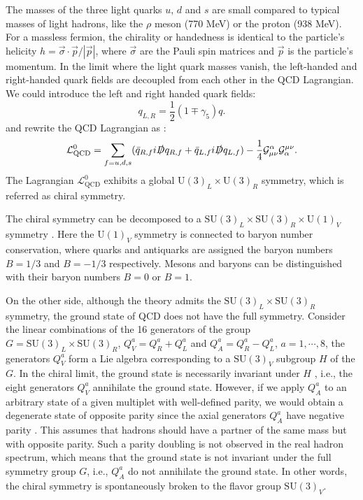The masses of the three light quarks $u$, $d$ and $s$ are small compared to typical masses of light hadrons, like the $\rho$ meson (770 MeV) or the proton (938 MeV). For a massless fermion, the chirality or handedness is identical to the particle's helicity $h = \vec{\sigma}\cdot\vec{p}/|\vec{p}|$, where $\vec{\sigma}$ are the Pauli spin matrices and $\vec{p}$ is the particle's momentum. In the limit where the light quark masses vanish, the left-handed and right-handed quark fields are decoupled from each other in the QCD Lagrangian. We could introduce the left and right handed quark fields:
\begin{equation}\label{C3S1E2}
q_{L,R} = \frac{1}{2}(1\mp\gamma_5)q.
\end{equation}
and rewrite the QCD Lagrangian as \cite{Scherer2003}:
\begin{equation} \label{C3S1E3}
\mathcal{L}_{\mathrm{QCD}}^0 = \sum_{f=u,d,s}(\bar{q}_{R,f}i\slashed{D}q_{R,f}+\bar{q}_{L,f}i\slashed{D}q_{L,f})-\frac{1}{4}\mathcal{G}_{\mu\nu}^\alpha\mathcal{G}_\alpha^{\mu\nu}.
\end{equation}
The Lagrangian $\mathcal{L}_{\mathrm{QCD}}^0$ exhibits a global $\mathrm{U}(3)_L\times\mathrm{U}(3)_R$ symmetry, which is referred as chiral symmetry.

The chiral symmetry can be decomposed to a $\mathrm{SU}(3)_L\times\mathrm{SU}(3)_R\times\mathrm{U}(1)_V$ symmetry \cite{Scherer2003}. Here the $\mathrm{U}(1)_V$ symmetry is connected to baryon number conservation, where quarks and antiquarks are assigned the baryon numbers $B=1/3$ and $B=-1/3$ respectively. Mesons and baryons can be distinguished with their baryon numbers $B=0$ or $B=1$.

On the other side, although the theory admits the $\mathrm{SU}(3)_L\times\mathrm{SU}(3)_R$ symmetry, the ground state of QCD does not have the full symmetry. Consider the linear combinations of the 16 generators of the group $G=\mathrm{SU}(3)_L\times\mathrm{SU}(3)_R$, $Q_V^a=Q_R^a+Q_L^a$ and $Q_A^a=Q_R^a-Q_L^a$, $a=1,\cdots,8$, the generators $Q_V^a$ form a Lie algebra corresponding to a $\mathrm{SU}(3)_V$ subgroup $H$ of the $G$. In the chiral limit, the ground state is necessarily invariant under $H$ \cite{Vafa1984}, i.e., the eight generators $Q_V^a$ annihilate the ground state. However, if we apply $Q_A^a$ to an arbitrary state of a given multiplet with well-defined parity, we would obtain a degenerate state of opposite parity since the axial generators $Q_A^a$ have negative parity \cite{Scherer2003}. This assumes that hadrons should have a partner of the same mass but with opposite parity. Such a parity doubling is not observed in the real hadron spectrum, which means that the ground state is not invariant under the full symmetry group $G$, i.e., $Q_A^a$ do not annihilate the ground state. In other words, the chiral symmetry is spontaneously broken to the flavor group $\mathrm{SU}(3)_V$.

